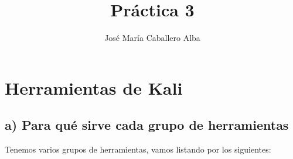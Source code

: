 \documentclass[a4paper]{article}
\title{Práctica 3 }
\author{José María Caballero Alba}
\begin{document}
\maketitle

\newpage

\tableofcontents

\newpage

\section{Herramientas de Kali}
\subsection{a) Para qué sirve cada grupo de herramientas }

Tenemos varios grupos de herramientas, vamos listando por los siguientes:
\end{document}
